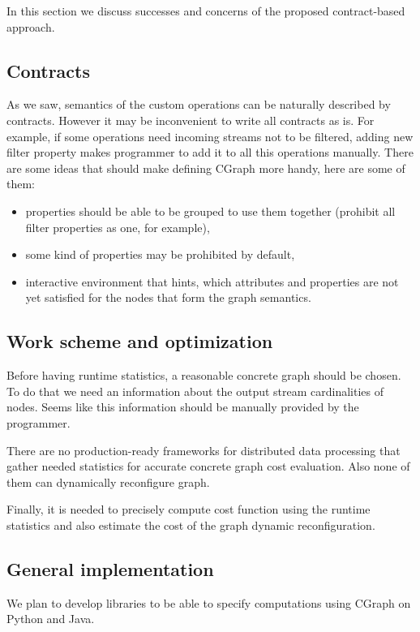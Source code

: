 In this section we discuss successes and concerns of the proposed contract-based approach.

\subsection{Contracts}

As we saw, semantics of the custom operations can be naturally described by contracts.
However it may be inconvenient to write all contracts as is.
For example, if some operations need incoming streams not to be filtered, adding new filter property makes programmer to add it to all this operations manually.
There are some ideas that should make defining CGraph more handy, here are some of them:
\begin{itemize}
    \item properties should be able to be grouped to use them together (prohibit all filter properties as one, for example),
    \item some kind of properties may be prohibited by default,
    \item interactive environment that hints, which attributes and properties are not yet satisfied for the nodes that form the graph semantics.
\end{itemize}

\subsection{Work scheme and optimization}

Before having runtime statistics, a reasonable concrete graph should be chosen.
To do that we need an information about the output stream cardinalities of nodes.
Seems like this information should be manually provided by the programmer.

There are no production-ready frameworks for distributed data processing that gather needed statistics for accurate concrete graph cost evaluation.
Also none of them can dynamically reconfigure graph.

Finally, it is needed to precisely compute cost function using the runtime statistics and also estimate the cost of the graph dynamic reconfiguration.

\subsection{General implementation}

We plan to develop libraries to be able to specify computations using CGraph on Python and Java.
